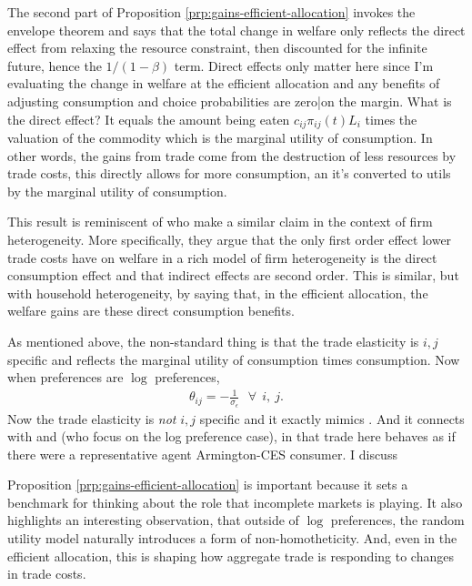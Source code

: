 \documentclass[12pt,pdftex]{article}
\begin{document}
\begin{onehalfspacing}
The second part of Proposition \ref{prp:gains-efficient-allocation} invokes the envelope theorem and says that the total change in welfare only reflects the direct effect from relaxing the resource constraint, then discounted for the infinite future, hence the $1/ (1-\beta)$ term. Direct effects only matter here since I'm evaluating the change in welfare at the efficient allocation and any benefits of adjusting consumption and choice probabilities are zero|on the margin. What is the direct effect? It equals the amount being eaten $c_{ij} \pi_{ij}(t) L_i$ times the valuation of the commodity which is the marginal utility of consumption. In other words, the gains from trade come from the destruction of less resources by trade costs, this directly allows for more consumption, an it's converted to utils by the marginal utility of consumption.

This result is reminiscent of \citet{AtkesonBurstein2010} who make a similar claim in the context of firm heterogeneity. More specifically, they argue that the only
first order effect lower trade costs have on welfare in a rich model of firm heterogeneity is the direct consumption effect and that indirect effects are second order. This is similar, but with household heterogeneity, by saying that, in the efficient allocation, the welfare gains are these direct consumption benefits.

As mentioned above, the non-standard thing is that the trade elasticity is $i,j$ specific and reflects the marginal utility of consumption times consumption. Now when preferences are $\log$ preferences,
\begin{align}
\theta_{ij} = -\frac{1}{\sigma_{\epsilon}} \ \ \ \forall \ \ i,\ j.
\end{align}
Now the trade elasticity is \textit{not} $i,j$ specific and it exactly mimics \citet{eaton2002technology}. And it connects with \citet{anderson1987ces} and \citet{anderson1992discrete} (who focus on the log preference case), in that trade here behaves as if there were a representative agent Armington-CES consumer. I discuss

Proposition \ref{prp:gains-efficient-allocation} is important because it sets a benchmark for thinking about the role that incomplete markets is playing. It also highlights an interesting observation, that outside of $\log$ preferences, the random utility model naturally introduces a form of non-homotheticity. And, even in the efficient allocation, this is shaping how aggregate trade is responding to changes in trade costs.




\end{onehalfspacing}
\end{document}

